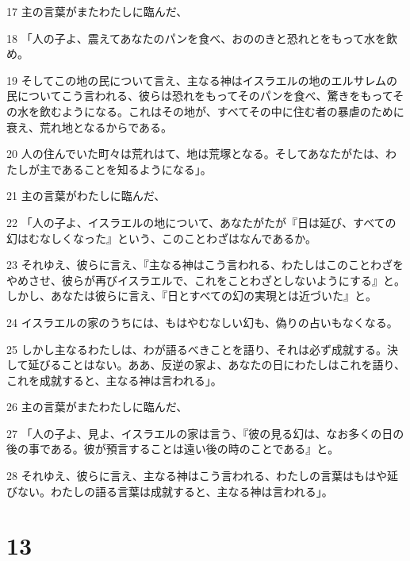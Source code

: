 \par 17 主の言葉がまたわたしに臨んだ、
\par 18 「人の子よ、震えてあなたのパンを食べ、おののきと恐れとをもって水を飲め。
\par 19 そしてこの地の民について言え、主なる神はイスラエルの地のエルサレムの民についてこう言われる、彼らは恐れをもってそのパンを食べ、驚きをもってその水を飲むようになる。これはその地が、すべてその中に住む者の暴虐のために衰え、荒れ地となるからである。
\par 20 人の住んでいた町々は荒れはて、地は荒塚となる。そしてあなたがたは、わたしが主であることを知るようになる」。
\par 21 主の言葉がわたしに臨んだ、
\par 22 「人の子よ、イスラエルの地について、あなたがたが『日は延び、すべての幻はむなしくなった』という、このことわざはなんであるか。
\par 23 それゆえ、彼らに言え、『主なる神はこう言われる、わたしはこのことわざをやめさせ、彼らが再びイスラエルで、これをことわざとしないようにする』と。しかし、あなたは彼らに言え、『日とすべての幻の実現とは近づいた』と。
\par 24 イスラエルの家のうちには、もはやむなしい幻も、偽りの占いもなくなる。
\par 25 しかし主なるわたしは、わが語るべきことを語り、それは必ず成就する。決して延びることはない。ああ、反逆の家よ、あなたの日にわたしはこれを語り、これを成就すると、主なる神は言われる」。
\par 26 主の言葉がまたわたしに臨んだ、
\par 27 「人の子よ、見よ、イスラエルの家は言う、『彼の見る幻は、なお多くの日の後の事である。彼が預言することは遠い後の時のことである』と。
\par 28 それゆえ、彼らに言え、主なる神はこう言われる、わたしの言葉はもはや延びない。わたしの語る言葉は成就すると、主なる神は言われる」。

\chapter{13}


